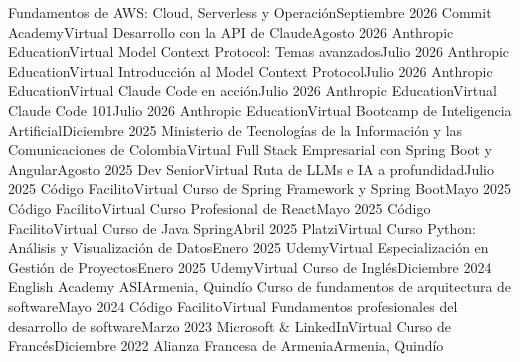 \resumeSubHeadingListStart
    \resumeSubheading
        {Fundamentos de AWS: Cloud, Serverless y Operación}{Septiembre 2026}
        {Commit Academy}{Virtual}
    \resumeSubheading
        {Desarrollo con la API de Claude}{Agosto 2026}
        {Anthropic Education}{Virtual}
    \resumeSubheading
        {Model Context Protocol: Temas avanzados}{Julio 2026}
        {Anthropic Education}{Virtual}
    \resumeSubheading
        {Introducción al Model Context Protocol}{Julio 2026}
        {Anthropic Education}{Virtual}
    \resumeSubheading
        {Claude Code en acción}{Julio 2026}
        {Anthropic Education}{Virtual}
    \resumeSubheading
        {Claude Code 101}{Julio 2026}
        {Anthropic Education}{Virtual}
    \resumeSubheading
        {Bootcamp de Inteligencia Artificial}{Diciembre 2025}
        {Ministerio de Tecnologías de la Información y las Comunicaciones de Colombia}{Virtual}
    \resumeSubheading
        {Full Stack Empresarial con Spring Boot y Angular}{Agosto 2025}
        {Dev Senior}{Virtual}
    \resumeSubheading
        {Ruta de LLMs e IA a profundidad}{Julio 2025}
        {Código Facilito}{Virtual}
    \resumeSubheading
        {Curso de Spring Framework y Spring Boot}{Mayo 2025}
        {Código Facilito}{Virtual}
    \resumeSubheading
        {Curso Profesional de React}{Mayo 2025}
        {Código Facilito}{Virtual}
    \resumeSubheading
        {Curso de Java Spring}{Abril 2025}
        {Platzi}{Virtual}
    \resumeSubheading
        {Curso Python: Análisis y Visualización de Datos}{Enero 2025}
        {Udemy}{Virtual}
    \resumeSubheading
        {Especialización en Gestión de Proyectos}{Enero 2025}
        {Udemy}{Virtual}
    \resumeSubheading
        {Curso de Inglés}{Diciembre 2024}
        {English Academy ASI}{Armenia, Quindío}
    \resumeSubheading
        {Curso de fundamentos de arquitectura de software}{Mayo 2024}
        {Código Facilito}{Virtual}
    \resumeSubheading
        {Fundamentos profesionales del desarrollo de software}{Marzo 2023}
        {Microsoft \& LinkedIn}{Virtual}
    \resumeSubheading
        {Curso de Francés}{Diciembre 2022}
        {Alianza Francesa de Armenia}{Armenia, Quindío}
\resumeSubHeadingListEnd
